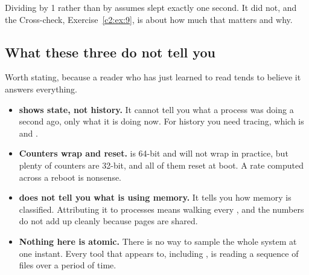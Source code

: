 \noindent Dividing  by 1 rather than by  assumes  slept
exactly one second. It did not, and the Cross-check, Exercise~\ref{c2:ex:9}, is about how much that
matters and why.

\subsection{What these three do not tell you}
\label{c2:app:b7}

Worth stating, because a reader who has just learned to read  tends to believe it
answers everything.
\begin{itemize}
  \item \textbf{ shows state, not history.} It cannot tell you what a process was doing
    a second ago, only what it is doing now. For history you need tracing, which is 
    and .
  \item \textbf{Counters wrap and reset.}  is 64-bit and will not wrap in practice, but
    plenty of counters are 32-bit, and all of them reset at boot. A rate computed across a reboot is
    nonsense.
  \item \textbf{ does not tell you what is using memory.} It tells you how
    memory is classified. Attributing it to processes means walking every ,
    and the numbers do not add up cleanly because pages are shared.
  \item \textbf{Nothing here is atomic.} There is no way to sample the whole system at one instant.
    Every tool that appears to, including , is reading a sequence of files over a period
    of time.
\end{itemize}
